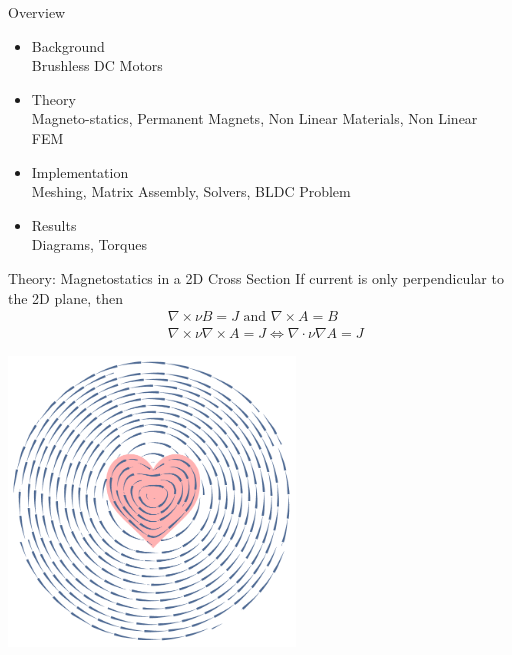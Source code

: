 \documentclass{beamer}
\begin{document}
    \begin{frame}{Overview}
        \begin{itemize}
            \item {\large Background}\\
            Brushless DC Motors
            \item {\large Theory}\\
            Magneto-statics, Permanent Magnets, Non Linear Materials, Non Linear FEM
            \item {\large Implementation}\\
            Meshing, Matrix Assembly, Solvers, BLDC Problem
            \item {\large Results}\\
            Diagrams, Torques
        \end{itemize}

    \end{frame}
    \begin{frame}{Theory: Magnetostatics in a 2D Cross Section}
        If current is only perpendicular to the 2D plane, then
        \begin{align*}
            &\nabla\times \nu B=J\text{ and }\nabla \times A = B\\
            &\nabla\times \nu \nabla\times A=J \iff \nabla\cdot \nu \nabla A=J
        \end{align*}
        \begin{center}
            \includegraphics[width=3in]{heartwire.pdf}
        \end{center}
    \end{frame}
\end{document}
